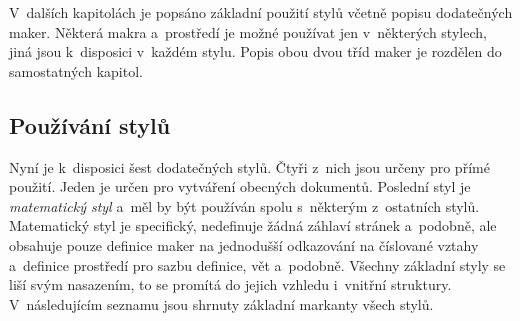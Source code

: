 \documentclass[12pt]{article}
\begin{document}
V~dalších kapitolách je popsáno základní použití stylů včetně popisu
dodatečných maker. Některá makra a~prostředí
je možné používat jen v~některých stylech,
jiná jsou k~disposici v~každém stylu.
Popis obou dvou tříd maker je rozdělen do samostatných kapitol.

\subsection{Používání stylů}
Nyní je k~disposici šest dodatečných stylů. Čtyři z~nich jsou určeny pro
přímé použití. Jeden je určen pro vytváření obecných dokumentů. Poslední styl
je \emph{matematický styl} a~měl by být používán spolu s~některým z~ostatních 
stylů. Matematický styl je specifický, nedefinuje
žádná záhlaví stránek a~podobně, ale obsahuje pouze definice maker na
jednodušší odkazování na číslované vztahy a~definice prostředí pro sazbu
definice, vět a~podobně. Všechny základní styly se liší svým nasazením, to se
promítá do jejich vzhledu i~vnitřní struktury. V~následujícím seznamu jsou
shrnuty základní markanty všech stylů.
\end{document}

